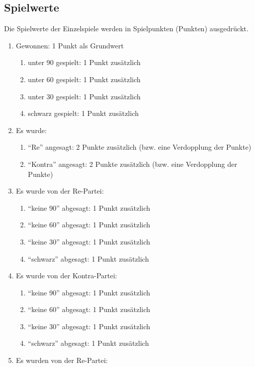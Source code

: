 \documentclass{scrartcl}
\begin{document}
\subsection{Spielwerte}

Die Spielwerte der Einzelspiele werden in Spielpunkten (Punkten) ausgedrückt.
\begin{enumerate}
  \item Gewonnen: 1 Punkt als Grundwert
    \begin{enumerate}
      \item unter 90 gespielt: 1 Punkt zusätzlich
      \item unter 60 gespielt: 1 Punkt zusätzlich
      \item unter 30 gespielt: 1 Punkt zusätzlich
      \item schwarz gespielt: 1 Punkt zusätzlich
    \end{enumerate}
  \item Es wurde:
    \begin{enumerate}
      \item "`Re"' angesagt: 2 Punkte zusätzlich (bzw. \optional eine
	Verdopplung der Punkte)
      \item "`Kontra"' angesagt: 2 Punkte zusätzlich (bzw. \optional eine
	Verdopplung der Punkte)
    \end{enumerate}
  \item Es wurde von der Re-Partei:
    \begin{enumerate}
      \item "`keine 90"' abgesagt: 1 Punkt zusätzlich
      \item "`keine 60"' abgesagt: 1 Punkt zusätzlich
      \item "`keine 30"' abgesagt: 1 Punkt zusätzlich
      \item "`schwarz"' abgesagt: 1 Punkt zusätzlich
    \end{enumerate}
  \item Es wurde von der Kontra-Partei:
    \begin{enumerate}
      \item "`keine 90"' abgesagt: 1 Punkt zusätzlich
      \item "`keine 60"' abgesagt: 1 Punkt zusätzlich
      \item "`keine 30"' abgesagt: 1 Punkt zusätzlich
      \item "`schwarz"' abgesagt: 1 Punkt zusätzlich
    \end{enumerate}
  \item Es wurden von der Re-Partei:

\end{enumerate}
\end{document}
